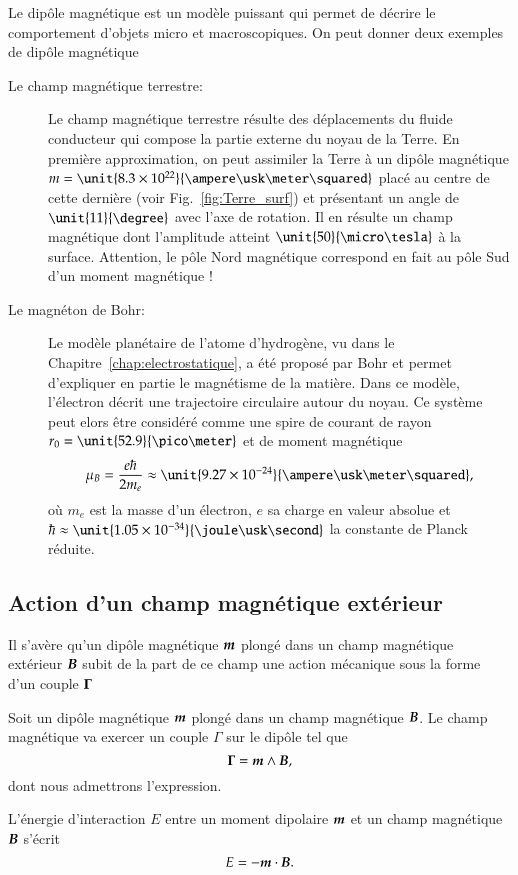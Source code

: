 	\begin{exemple}
		Le dipôle magnétique est un modèle puissant qui permet de 
		décrire le comportement d'objets micro et macroscopiques. On peut
		donner deux exemples de dipôle magnétique
		\begin{description}
			\item[Le champ magnétique terrestre: ] Le champ magnétique
			 terrestre résulte des déplacements du fluide conducteur
			 qui compose la partie externe du noyau de la Terre.
			 En première approximation, on peut assimiler la Terre 
			 à un dipôle magnétique $m = \unit{8.3 \times 10^{22}}
			 {\ampere \usk \meter \squared}$ placé au centre de cette dernière
			 (voir Fig.~\ref{fig:Terre_surf})
			 et présentant un angle de $\unit{11}{\degree}$
			 avec l'axe de rotation. Il en résulte un champ
			 magnétique dont l'amplitude atteint $\unit{50}{\micro \tesla}$
			 à la surface.
			 Attention, le pôle Nord magnétique
			 correspond en fait au pôle Sud d'un moment magnétique !
			\item[Le magnéton de Bohr: ] Le modèle planétaire de l'atome
			d'hydrogène, vu dans le Chapitre~\ref{chap:electrostatique},
			a été proposé par Bohr et permet d'expliquer en partie le magnétisme
			de la matière. Dans ce modèle, l'électron décrit une trajectoire
			circulaire autour du noyau. Ce système peut elors être considéré
			comme une spire de courant de rayon $r_0 = \unit{52.9}{\pico \meter}$
			et de moment magnétique
						\begin{equation*}
				\mu_B = \dfrac{e \hbar}{2 m_e} \approx 
				\unit{9.27 \times 10^{-24}}{\ampere \usk 
				\meter \squared},
			\end{equation*}
			où $m_e$ est la masse d'un électron, $e$ sa charge en 
			valeur absolue et $\hbar \approx 
			\unit{1.05 \times 10^{-34}}{\joule \usk \second}$ 
			la constante de Planck réduite.
		\end{description}
	\end{exemple}

\subsection{Action d'un champ magnétique extérieur}
Il s'avère qu'un dipôle magnétique $\vecm$ plongé dans un champ magnétique extérieur 
$\vecb$ subit de la part de ce champ une action mécanique sous la forme d'un couple
$\mitbf{\Gamma}$
\begin{defn}
	Soit un dipôle magnétique $\vecm$ plongé dans un champ magnétique $\vecb$.
	Le champ magnétique va exercer un couple $\Gamma$ sur le dipôle tel que
\begin{equation}
	\mitbf{\Gamma} = \vecm \wedge \vecb,
\end{equation}
dont nous admettrons l'expression. 

L'énergie d'interaction $E$ entre un moment dipolaire $\vecm$ et un champ magnétique
$\vecb$ s'écrit
\begin{equation*}
	E = - \vecm \cdot \vecb.
\end{equation*}
\end{defn}


